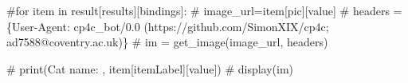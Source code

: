 \documentclass[
  letterpaper,
  DIV=11,
  numbers=noendperiod]{scrreprt}
\newenvironment{Shaded}{\begin{snugshade}}{\end{snugshade}}
\newcommand{\CommentTok}[1]{\textcolor[rgb]{0.37,0.37,0.37}{#1}}
\begin{document}
\begin{Shaded}
\begin{Highlighting}[]
\CommentTok{\#for item in result[\textquotesingle{}results\textquotesingle{}][\textquotesingle{}bindings\textquotesingle{}]:}
    \CommentTok{\# image\_url=item[\textquotesingle{}pic\textquotesingle{}][\textquotesingle{}value\textquotesingle{}]}
    \CommentTok{\# headers = \{\textquotesingle{}User{-}Agent\textquotesingle{}: \textquotesingle{}cp4c\_bot/0.0 (https://github.com/SimonXIX/cp4c; ad7588@coventry.ac.uk)\textquotesingle{}\}}
    \CommentTok{\# im = get\_image(image\_url, headers)}

    \CommentTok{\# print(\textquotesingle{}Cat name: \textquotesingle{}, item[\textquotesingle{}itemLabel\textquotesingle{}][\textquotesingle{}value\textquotesingle{}])}
    \CommentTok{\# display(im)}
\end{Highlighting}
\end{Shaded}
\end{document}
